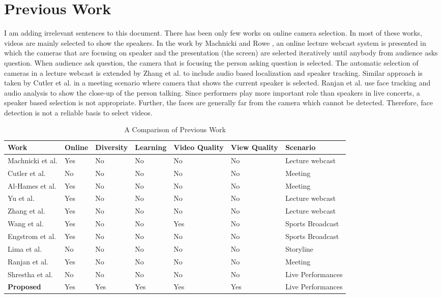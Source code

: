 \documentclass{sig-alternate}
\begin{document}
\section{Previous Work}\label{previous}
I am adding irrelevant sentences to this document. 
There has been only few works on online camera selection. In
most of these works, videos are mainly selected to show the speakers.
In the work by Machnicki and Rowe \cite{9}, an online lecture
webcast system is presented in which the cameras that are focusing
on speaker and the presentation (the screen) are selected iteratively
until anybody from audience asks question. When audience ask
question, the camera that is focusing the person asking question is
selected. The automatic selection of cameras in a lecture webcast
is extended by Zhang et al. \cite{21} to include audio based localization
and speaker tracking. Similar approach is taken by Cutler et al. \cite{6}
in a meeting scenario where camera that shows the current speaker
is selected. Ranjan et al. \cite{12} use face tracking and audio analysis
to show the close-up of the person talking. Since performers
play more important role than speakers in live concerts, a speaker
based selection is not appropriate. Further, the faces are generally
far from the camera which cannot be detected. Therefore, face detection
is not a reliable basis to select videos.

\begin{table}
\fontsize{6}{10}\selectfont
\centering
\caption{A Comparison of Previous Work}
\label{table1}
\begin{tabularx}{\textwidth}{p{3cm}|X|X|X|X|X|p{3cm}}

\hline
Work & Online & Diversity & Learning & Video Quality  & View Quality & Scenario\\
\hline
Machnicki et al.\cite{9} & Yes & No & No & No  & No & Lecture webcast\\
\hline
Cutler et al. \cite{6} & No &  No & No  & No  & No & Meeting\\
\hline
Al-Hames et al. \cite{3} & Yes & No &  No  & No & No &  Meeting\\
\hline
Yu et al. & Yes \cite{20}& No & No  & No  & No & Lecture webcast\\
\hline
Zhang et al. \cite{21}& Yes & No &  No  & No  & No & Lecture webcast\\
\hline
Wang et al. \cite{16}& Yes & No & No  & Yes  & No & Sports Broadcast\\
\hline
Engstrom et al. \cite{8} & Yes & No & No  & No  & No & Sports Broadcast\\
\hline
Lima et al. \cite{7}& No & No & No  & No  & No & Storyline\\
\hline
Ranjan et al. \cite{12}& Yes & No & No  & No  & No & Meeting\\
\hline
Shrestha et al. \cite{15}& No & No & No  & No  & No & Live Performances\\
\hline
\textbf{Proposed} & Yes & Yes & Yes  & Yes  & Yes & Live Performances\\
\hline
\end{tabularx}
\end{table}
\end{document}
